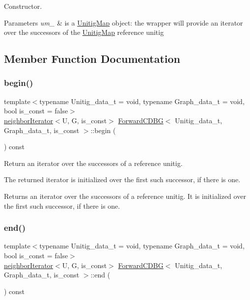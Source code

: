 Constructor. 


\begin{DoxyParams}{Parameters}
{\em um\+\_\+} & is a \hyperlink{classUnitigMap}{Unitig\+Map} object\+: the wrapper will provide an iterator over the successors of the \hyperlink{classUnitigMap}{Unitig\+Map} reference unitig \\
\hline
\end{DoxyParams}


\subsection{Member Function Documentation}
\mbox{\label{classForwardCDBG_a18fd34268b50793eabde303c3e9ed5db}} 
\subsubsection{\texorpdfstring{begin()}{begin()}}
{\footnotesize\ttfamily template$<$typename Unitig\+\_\+data\+\_\+t  = void, typename Graph\+\_\+data\+\_\+t  = void, bool is\+\_\+const = false$>$ \\
\hyperlink{classneighborIterator}{neighbor\+Iterator}$<$U, G, is\+\_\+const$>$ \hyperlink{classForwardCDBG}{Forward\+C\+D\+BG}$<$ Unitig\+\_\+data\+\_\+t, Graph\+\_\+data\+\_\+t, is\+\_\+const $>$\+::begin (\begin{DoxyParamCaption}{ }\end{DoxyParamCaption}) const}



Return an iterator over the successors of a reference unitig. 

The returned iterator is initialized over the first such successor, if there is one. \begin{DoxyReturn}{Returns}
an iterator over the successors of a reference unitig. It is initialized over the first such successor, if there is one. 
\end{DoxyReturn}
\mbox{\label{classForwardCDBG_a83c2f8b929022aa77289177ec5ce7869}} 
\subsubsection{\texorpdfstring{end()}{end()}}
{\footnotesize\ttfamily template$<$typename Unitig\+\_\+data\+\_\+t  = void, typename Graph\+\_\+data\+\_\+t  = void, bool is\+\_\+const = false$>$ \\
\hyperlink{classneighborIterator}{neighbor\+Iterator}$<$U, G, is\+\_\+const$>$ \hyperlink{classForwardCDBG}{Forward\+C\+D\+BG}$<$ Unitig\+\_\+data\+\_\+t, Graph\+\_\+data\+\_\+t, is\+\_\+const $>$\+::end (\begin{DoxyParamCaption}{ }\end{DoxyParamCaption}) const}



